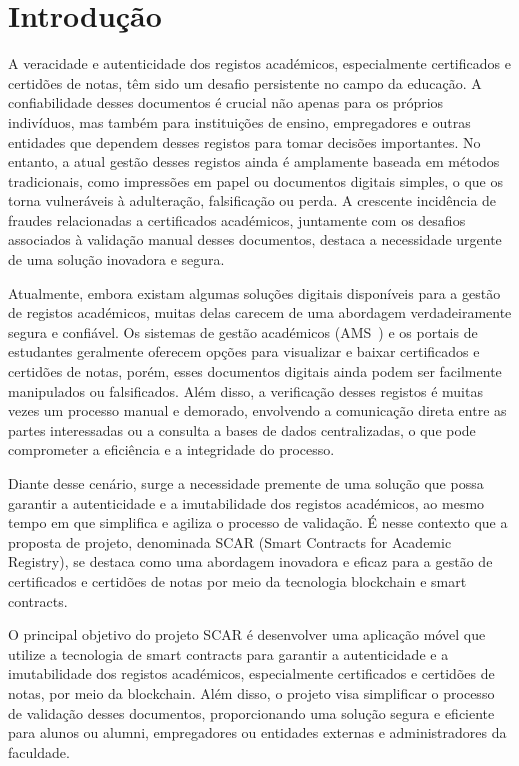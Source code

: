 \documentclass[10pt]{article}
\begin{document}
\section{Introdução}

A veracidade e autenticidade dos registos académicos, especialmente certificados e certidões de notas,
têm sido um desafio persistente no campo da educação. A confiabilidade desses documentos é crucial não apenas
para os próprios indivíduos, mas também para instituições de ensino, empregadores e outras entidades que
dependem desses registos para tomar decisões importantes. No entanto, a atual gestão desses registos
ainda é amplamente baseada em métodos tradicionais, como impressões em papel ou documentos digitais simples,
o que os torna vulneráveis à adulteração, falsificação ou perda. A crescente incidência de fraudes
relacionadas a certificados académicos, juntamente com os desafios associados à validação manual desses
documentos, destaca a necessidade urgente de uma solução inovadora e segura.

Atualmente, embora existam algumas soluções digitais disponíveis para a gestão de registos académicos,
muitas delas carecem de uma abordagem verdadeiramente segura e confiável. Os sistemas de gestão académicos
(AMS~\cite{LinWays}) e os portais de estudantes geralmente oferecem opções para visualizar e baixar certificados e certidões
de notas, porém, esses documentos digitais ainda podem ser facilmente manipulados ou falsificados. Além disso,
a verificação desses registos é muitas vezes um processo manual e demorado, envolvendo a comunicação direta entre
as partes interessadas ou a consulta a bases de dados centralizadas, o que pode comprometer a eficiência
e a integridade do processo.

Diante desse cenário, surge a necessidade premente de uma solução que possa garantir a autenticidade e a
imutabilidade dos registos académicos, ao mesmo tempo em que simplifica e agiliza o processo de validação.
É nesse contexto que a proposta de projeto, denominada SCAR (Smart Contracts for Academic Registry),
se destaca como uma abordagem inovadora e eficaz para a gestão de certificados e certidões de notas por
meio da tecnologia blockchain e smart contracts.

O principal objetivo do projeto SCAR é desenvolver uma aplicação móvel que utilize a tecnologia de smart contracts
para garantir a autenticidade e a imutabilidade dos registos académicos, especialmente certificados e certidões
de notas, por meio da blockchain. Além disso, o projeto visa simplificar o processo de validação desses documentos,
proporcionando uma solução segura e eficiente para alunos ou alumni, empregadores ou entidades externas e administradores da faculdade.
\end{document}
